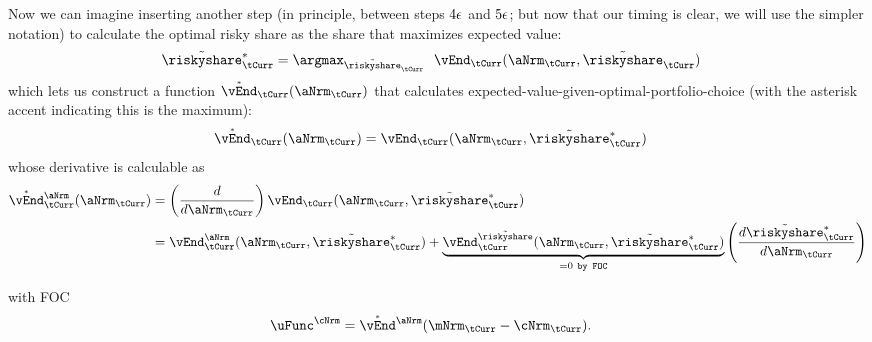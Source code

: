 \documentclass[./SolvingMicroDSOPs_TRP]{subfiles}
\begin{document}
Now we can imagine inserting another step (in principle, between steps $4\epsilon$ and $5\epsilon$; but now that our timing is clear, we will use the simpler notation) to calculate the optimal risky share as the share that maximizes expected value:
\begin{align}
  \Rend{\riskyshare}_{\tCurr}^{*} & = \argmax_{\Rend{\riskyshare}_{\tCurr}} ~~\vEnd_{\tCurr}(\aNrm_{\tCurr},\Rend{\riskyshare}_{\tCurr})
\end{align}
which lets us construct a function $\Maxed{\vEnd}_{\tCurr}(\aNrm_{\tCurr})$ that calculates expected-value-given-optimal-portfolio-choice (with the asterisk accent indicating this is the maximum):
\begin{align}
   \Maxed{\vEnd}_{\tCurr}(\aNrm_{\tCurr}) & = \vEnd_{\tCurr}(\aNrm_{\tCurr},\Rend{\riskyshare}_{\tCurr}^{*})       
\end{align}
whose derivative is calculable as
\begin{align}
  \Maxed{\vEnd}_{\tCurr}^{\aNrm}(\aNrm_{\tCurr}) & = \left(\frac{d}{d \aNrm_{\tCurr}}\right) \vEnd_{\tCurr}(\aNrm_{\tCurr},\Rend{\riskyshare}_{\tCurr}^{*}) 
  \\ & = \vEnd_{\tCurr}^{\aNrm}(\aNrm_{\tCurr},\Rend{\riskyshare}_{\tCurr}^{*})+\underbrace{
       \vEnd_{\tCurr}^{\Rend{\riskyshare}}(\aNrm_{\tCurr},\Rend{\riskyshare}_{\tCurr}^{*})}_{=0~\texttt{by FOC}}\left(\frac{d \Rend{\riskyshare}_{\tCurr}^{*}}{d \aNrm_{\tCurr}}\right) \notag
\end{align}


with FOC
\begin{align}
  \uFunc^{\cNrm} & = \Maxed{\vEnd}^{\aNrm}(\mNrm_{\tCurr}-\cNrm_{\tCurr}) \label{eq:FOCRoman}.
\end{align}
\end{document}
